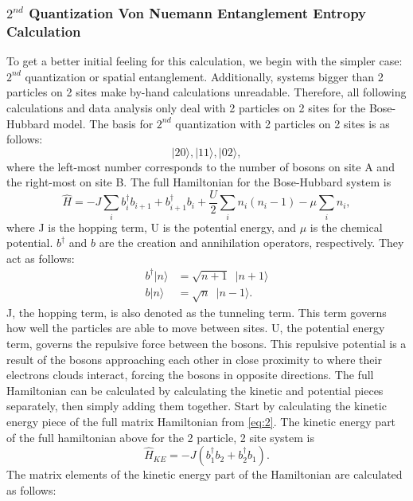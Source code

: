 \subsubsection{$2^{nd}$ Quantization Von Nuemann Entanglement Entropy Calculation}
To get a better initial feeling for this calculation, we begin with the simpler case: $2^{nd}$ quantization or spatial entanglement. Additionally, systems bigger than 2 particles on 2 sites make by-hand calculations unreadable. Therefore, all following calculations and data analysis only deal with 2 particles on 2 sites for the Bose-Hubbard model. The basis for $2^{nd}$ quantization with 2 particles on 2 sites is as follows:
\begin{equation}
|2 0 \rangle, |1 1 \rangle, |0 2 \rangle,
\end{equation}
\noindent where the left-most number corresponds to the number of bosons on site A and the right-most on site B. The full Hamiltonian for the Bose-Hubbard system is
\begin{equation}
\hat{H} = -J\sum_i{b_i^{\dagger}b_{i+1} + b_{i+1}^{\dagger}b_i} + \frac{U}{2}\sum_i{n_i(n_i - 1)} - \mu\sum_i{n_i},
\label{eq:2}
\end{equation}
\noindent where J is the hopping term, U is the potential energy, and $\mu$ is the chemical potential. $b^{\dagger}$ and $b$ are the creation and annihilation operators, respectively. They act as follows:
\begin{align}
b^{\dagger}|n\rangle &= \sqrt{n+1}\enspace|n+1\rangle \\
b|n\rangle &= \sqrt{n}\enspace|n-1\rangle.
\end{align}
\noindent J, the hopping term, is also denoted as the tunneling term. This term governs how well the particles are able to move between sites. U, the potential energy term, governs the repulsive force between the bosons. This repulsive potential is a result of the bosons approaching each other in close proximity to where their electrons clouds interact, forcing the bosons in opposite directions. 
\noindent The full Hamiltonian can be calculated by calculating the kinetic and potential pieces separately, then simply adding them together. Start by calculating the kinetic energy piece of the full matrix Hamiltonian from \cref{eq:2}. The kinetic energy part of the full hamiltonian above for the 2 particle, 2 site system is
\begin{equation}
\hat{H}_{KE}=-J(b_1^{\dagger}b_2+b_2^{\dagger}b_1).
\end{equation}
\noindent The matrix elements of the kinetic energy part of the Hamiltonian are calculated as follows:
